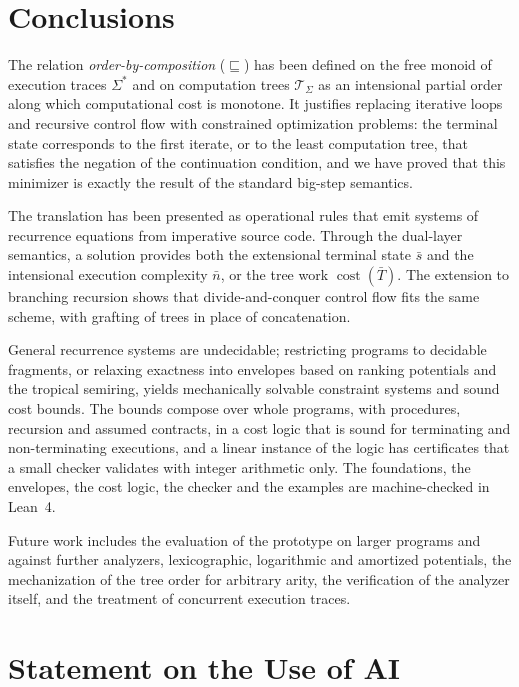 \documentclass[oneside,english]{amsart}
\numberwithin{equation}{section}
\numberwithin{figure}{section}
\theoremstyle{plain}
\theoremstyle{definition}
\theoremstyle{plain}
\theoremstyle{remark}
\theoremstyle{plain}
\theoremstyle{definition}
\theoremstyle{plain}
\theoremstyle{remark}
\DeclareMathOperator{\cost}{cost}
\begin{document}
\section*{Conclusions}

The relation \textit{order-by-composition} ($\sqsubseteq$) has been defined on the free monoid of execution traces $\Sigma^*$ and on computation trees $\mathcal{T}_\Sigma$ as an intensional partial order along which computational cost is monotone. It justifies replacing iterative loops and recursive control flow with constrained optimization problems: the terminal state corresponds to the first iterate, or to the least computation tree, that satisfies the negation of the continuation condition, and we have proved that this minimizer is exactly the result of the standard big-step semantics.

The translation has been presented as operational rules that emit systems of recurrence equations from imperative source code. Through the dual-layer semantics, a solution provides both the extensional terminal state $\bar{s}$ and the intensional execution complexity $\bar{n}$, or the tree work $\cost(\bar{T})$. The extension to branching recursion shows that divide-and-conquer control flow fits the same scheme, with grafting of trees in place of concatenation.

General recurrence systems are undecidable; restricting programs to decidable fragments, or relaxing exactness into envelopes based on ranking potentials and the tropical semiring, yields mechanically solvable constraint systems and sound cost bounds. The bounds compose over whole programs, with procedures, recursion and assumed contracts, in a cost logic that is sound for terminating and non-terminating executions, and a linear instance of the logic has certificates that a small checker validates with integer arithmetic only. The foundations, the envelopes, the cost logic, the checker and the examples are machine-checked in Lean~4.

Future work includes the evaluation of the prototype on larger programs and against further analyzers, lexicographic, logarithmic and amortized potentials, the mechanization of the tree order for arbitrary arity, the verification of the analyzer itself, and the treatment of concurrent execution traces.

\section*{Statement on the Use of AI}
\end{document}
